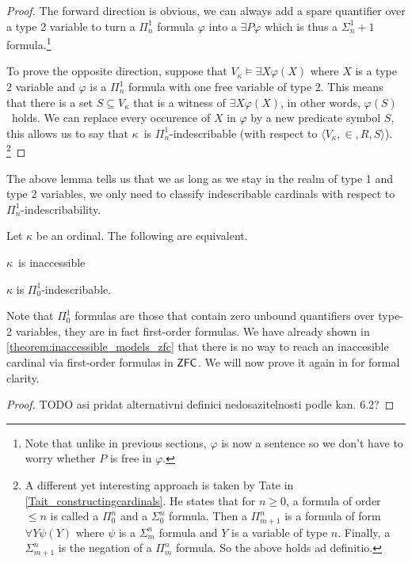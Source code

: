 \begin{proof}
The forward direction is obvious, we can always add a spare quantifier over a type 2 variable to turn a $\Pi^1_n$ formula $\varphi$ into a $\exists P \varphi$ which is thus a $\Sigma^1_n+1$ formula.\footnote{Note that unlike in previous sections, $\varphi$ is now a sentence so we don't have to worry whether $P$ is free in $\varphi$.}

To prove the opposite direction, suppose that $V_\kappa \models \exists X \varphi(X)$ where $X$ is a type 2 variable and $\varphi$ is a $\Pi^1_n$ formula with one free variable of type 2. This means that there is a set $S \subseteq V_\kappa$ that is a witness of $\exists X \varphi(X)$, in other words, $\varphi(S)$ holds. We can replace every occurence of $X$ in $\varphi$ by a new predicate symbol $S$, this allows us to say that $\kappa$ is $\Pi^1_n$-indescribable (with respect to $\langle V_\kappa, \in, R, S \rangle$).
\footnote{A different yet interesting approach is taken by Tate in \ref{Tait_constructingcardinals}. He states that for $n\geq 0$, a formula of order $\leq n$ is called a $\Pi^n_0$ and a $\Sigma^n_0$ formula. Then a $\Pi^n_{m+1}$ is a formula of form $\forall Y \psi(Y)$ where $\psi$ is a $\Sigma^n_m$ formula and $Y$ is a variable of type $n$. Finally, a $\Sigma^n_{m+1}$ is the negation of a $\Pi^n_m$ formula. So the above holds ad definitio.}
\end{proof}

The above lemma tells us that we as long as we stay in the realm of type 1 and type 2 variables, we only need to classify indescribable cardinals with respect to $\Pi^1_n$-indescribability.

\begin{theorem}
Let $\kappa$ be an ordinal. The following are equivalent.
\bce[(i)]
\item $\kappa$ is inaccessible
\item $\kappa$ is $\Pi^1_0$-indescribable.
\ece
\end{theorem}

Note that $\Pi^1_0$ formulas are those that contain zero unbound quantifiers over type-2 variables, they are in fact first-order formulas. We have already shown in \ref{theorem:inaccessible_models_zfc} that there is no way to reach an inaccesible cardinal via first-order formulas in $\sf{ZFC}$. We will now prove it again in for formal clarity.

\begin{proof}
TODO asi pridat alternativni definici nedosazitelnosti podle kan. 6.2?
\end{proof}

